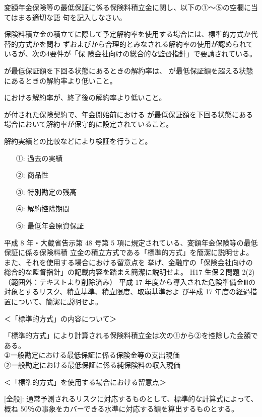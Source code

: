 \documentclass[report,gutter=10mm,fore-edge=10mm,uplatex,dvipdfmx]{jlreq}
\begin{document}
{
変額年金保険等の最低保証に係る保険料積立金に関し、以下の①～⑤の空欄に当てはまる適切な語
句を記入しなさい。

保険料積立金の積立てに際して予定解約率を使用する場合には、標準的方式か代替的方式かを問わ
ずおよびから合理的とみなされる解約率の使用が認められているが、次の4要件が「保
険会社向けの総合的な監督指針」で要請されている。

が最低保証額を下回る状態にあるときの解約率は、
が最低保証額を超える状態にあるときの解約率より低いこと。

における解約率が、終了後の解約率より低いこと。

が付された保険契約で、年金開始前における
が最低保証額を下回る状態にある場合において解約率が保守的に設定されていること。

解約実績との比較などにより検証を行うこと。

\answer{}
\begin{itemize}
\item[①: ] 過去の実績
\item[②: ] 商品性
\item[③: ] 特別勘定の残高
\item[④: ] 解約控除期間
\item[⑤: ] 最低年金原資保証
\end{itemize}


平成 8 年・大蔵省告示第 48 号第 5 項に規定されている、変額年金保険等の最低保証に係る保険料積
立金の積立方式である「標準的方式」を簡潔に説明せよ。また、それを使用する場合における留意点を
挙げ、金融庁の「保険会社向けの総合的な監督指針」の記載内容を踏まえ簡潔に説明せよ。
H17 生保２問題 2(2) （範囲外：テキストより削除済み）
平成 17 年度から導入された危険準備金Ⅲの対象とするリスク、積立基準、積立限度、取崩基準およ
び平成 17 年度の経過措置について、簡潔に説明せよ。

\answer{}
＜「標準的方式」の内容について＞

「標準的方式」により計算される保険料積立金は次の①から②を控除した金額である。\\
①一般勘定における最低保証に係る保険金等の支出現価\\
②一般勘定における最低保証に係る純保険料の収入現価

＜「標準的方式」を使用する場合における留意点＞

[全般]: 通常予測されるリスクに対応するものとして、標準的な計算式によって、概ね
50％の事象をカバーできる水準に対応する額を算出するものとする。

}
\end{document}

